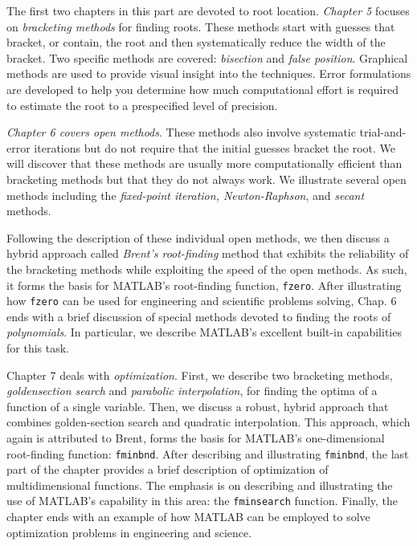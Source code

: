\documentclass[../main.tex]{subfiles}
\begin{document}
\noindent
The first two chapters in this part are devoted to root location. \emph{Chapter 5} focuses on \emph{bracketing methods} 
for finding roots. These methods start with guesses that bracket, or contain,
the root and then systematically reduce the width of the bracket. Two specific methods are
covered: \emph{bisection} and \emph{false position}. Graphical methods are used to provide visual insight
into the techniques. Error formulations are developed to help you determine how much
computational effort is required to estimate the root to a prespecified level of precision.

\emph{Chapter 6 covers open methods}. These methods also involve systematic trial-and-error
iterations but do not require that the initial guesses bracket the root. We will discover that
these methods are usually more computationally efficient than bracketing methods but that
they do not always work. We illustrate several open methods including the \emph{fixed-point
iteration, Newton-Raphson}, and \emph{secant} methods.

Following the description of these individual open methods, we then discuss a hybrid
approach called \emph{Brent's root-finding} method that exhibits the reliability of the bracketing
methods while exploiting the speed of the open methods. As such, it forms the basis for
MATLAB's root-finding function, \texttt{fzero}. After illustrating how \texttt{fzero} can be used for engineering
and scientific problems solving, Chap. 6 ends with a brief discussion of special
methods devoted to finding the roots of \emph{polynomials}. In particular, we describe MATLAB's
excellent built-in capabilities for this task.

Chapter 7 deals with \emph{optimization}. First, we describe two bracketing methods, \emph{goldensection
search} and \emph{parabolic interpolation}, for finding the optima of a function of a single
variable. Then, we discuss a robust, hybrid approach that combines golden-section search
and quadratic interpolation. This approach, which again is attributed to Brent, forms the
basis for MATLAB's one-dimensional root-finding function: \texttt{fminbnd}. After describing
and illustrating \texttt{fminbnd}, the last part of the chapter provides a brief description of optimization
of multidimensional functions. The emphasis is on describing and illustrating the
use of MATLAB's capability in this area: the \texttt{fminsearch} function. Finally, the chapter
ends with an example of how MATLAB can be employed to solve optimization problems
in engineering and science.
\end{document}
